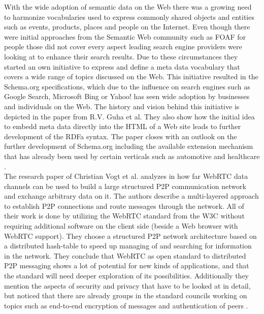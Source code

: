 With the wide adoption of semantic data on the Web there was a growing need to harmonize vocabularies used to express commonly shared objects and entities such as events, products, places and people on the Internet. Even though there were initial approaches from the Semantic Web community such as \gls{FOAF} for people those did not cover every aspect leading search engine providers were looking at to enhance their search results. Due to these circumstances they started an own initiative to express and define a meta data vocabulary that covers a wide range of topics discussed on the Web. This initiative resulted in the Schema.org specifications, which due to the influence on search engines such as Google Search, Microsoft Bing or Yahoo! has seen wide adoption by businesses and individuals on the Web. The history and vision behind this initiative is depicted in the paper from R.V. Guha et al. They also show how the initial idea to embedd meta data directly into the \gls{HTML} of a Web site leads to further development of the \gls{RDFa} syntax. The paper closes with an outlook on the further development of Schema.org including the available extension mechanism that has already been used by certain verticals such as automotive and healthcare \citep{guha2016schema}. \\

The research paper of Christian Vogt et al. analyzes in how far \gls{WebRTC} data channels can be used to build a large structured \gls{P2P} communication network and exchange arbitrary data on it. The authors describe a multi-layered approach to establish \gls{P2P} connections and route messages through the network. All of their work is done by utilizing the \gls{WebRTC} standard from the \gls{W3C} without requiring additional software on the client side (beside a Web browser with \gls{WebRTC} support). They choose a structured \gls{P2P} network architecture based on a distributed hash-table to speed up managing of and searching for information in the network. They conclude that \gls{WebRTC} as open standard to distributed \gls{P2P} messaging shows a lot of potential for new kinds of applications, and that the standard will need deeper exploration of its possibilities. Additionally they mention the aspects of security and privacy that have to be looked at in detail, but noticed that there are already groups in the standard councils working on topics such as end-to-end encryption of messages and authentication of peers \citep{vogt2013leveraging}. \\

